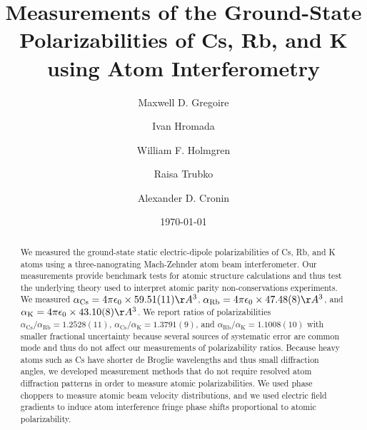 \documentclass[twocolumn,prl,showpacs,superscriptaddress]{revtex4-1}   %
\newcommand{\ak}{\alpha_{\textrm{K}}}
\newcommand{\arb}{\alpha_{\textrm{Rb}}}
\newcommand{\acs}{\alpha_{\textrm{Cs}}}
\newcommand{\ratRbK}{1.1008(10)}
\newcommand{\ratCsK}{1.3791(9)}
\newcommand{\ratCsRb}{1.2528(11)}
\begin{document}
\title{Measurements of the Ground-State Polarizabilities of Cs, Rb, and K using Atom Interferometry}

\author{Maxwell D. Gregoire}
\author{Ivan Hromada}
\author{William F. Holmgren}
\author{Raisa Trubko}
\author{Alexander D. Cronin}

\date{\today}





\begin{abstract}
We measured the ground-state static electric-dipole polarizabilities of Cs, Rb, and K atoms using a three-nanograting Mach-Zehnder atom beam interferometer.  Our measurements provide benchmark tests for atomic structure calculations and thus test the underlying theory used to interpret atomic parity non-conservations experiments.  We measured $\acs = 4\pi\epsilon_0 \times 59.51(11) \AA^3$, $\arb = 4\pi\epsilon_0 \times 47.48(8) \AA^3$, and $\ak = 4\pi\epsilon_0 \times 43.10(8)\AA^3$.   We report ratios of polarizabilities $\acs/\arb = \ratCsRb$, $\acs/\ak = \ratCsK$, and $\arb/\ak = \ratRbK$ with smaller fractional uncertainty because several sources of systematic error are common mode and thus do not affect our measurements of polarizability ratios.  Because heavy atoms such as Cs have shorter de Broglie wavelengths and thus small diffraction angles, we developed measurement methods that do not require resolved atom diffraction patterns in order to measure atomic polarizabilities.  We used phase choppers to measure atomic beam velocity distributions, and we used electric field gradients to induce atom interference fringe phase shifts proportional to atomic polarizability.
\end{abstract}
\end{document}
